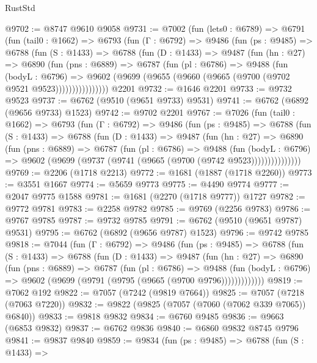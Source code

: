 \begin{lexlean}{RustStd}
\begin{coremodule}
@9702 := @8747 @9610 @9058
@9731 := @7002
    (fun (lets0 : @6789) =>
    @6791
      (fun (tail0 : @1662) =>
      @6793
        (fun (Γ : @6792) =>
        @9486
          (fun (ps : @9485) =>
          @6788
            (fun (S : @1433) =>
            @6788
              (fun (D : @1433) =>
              @9487
                (fun (hn : @27) =>
                @6890
                  (fun (pns : @6889) =>
                  @6787
                    (fun (pl : @6786) =>
                    @9488
                      (fun (bodyL : @6796) =>
                      @9602 (@9699 (@9655 (@9660 (@9665 (@9700 (@9702 @9521 @9523))))))))))))))))
    @2201
@9732 := @1646 @2201
@9733 := @9732 @9523
@9737 := @6762 (@9510 (@9651 @9733) @9531)
@9741 := @6762 (@6892 (@9656 @9733) @1523)
@9742 := @9702 @2201
@9767 := @7026
    (fun (tail0 : @1662) =>
    @6793
      (fun (Γ : @6792) =>
      @9486
        (fun (ps : @9485) =>
        @6788
          (fun (S : @1433) =>
          @6788
            (fun (D : @1433) =>
            @9487
              (fun (hn : @27) =>
              @6890
                (fun (pns : @6889) =>
                @6787
                  (fun (pl : @6786) =>
                  @9488
                    (fun (bodyL : @6796) =>
                    @9602 (@9699 (@9737 (@9741 (@9665 (@9700 (@9742 @9523)))))))))))))))
@9769 := @2206 (@1718 @2213)
@9772 := @1681 (@1887 (@1718 @2260))
@9773 := @3551 @1667
@9774 := @5659 @9773
@9775 := @4490 @9774
@9777 := @2047 @9775 @1588
@9781 := @1681 (@2270 (@1718 @9777)) @1727
@9782 := @9772 @9781
@9783 := @2258 @9782
@9785 := @9769 (@2256 @9783)
@9786 := @9767 @9785
@9787 := @9732 @9785
@9791 := @6762 (@9510 (@9651 @9787) @9531)
@9795 := @6762 (@6892 (@9656 @9787) @1523)
@9796 := @9742 @9785
@9818 := @7044
    (fun (Γ : @6792) =>
    @9486
      (fun (ps : @9485) =>
      @6788
        (fun (S : @1433) =>
        @6788
          (fun (D : @1433) =>
          @9487
            (fun (hn : @27) =>
            @6890
              (fun (pns : @6889) =>
              @6787
                (fun (pl : @6786) =>
                @9488
                  (fun (bodyL : @6796) =>
                  @9602 (@9699 (@9791 (@9795 (@9665 (@9700 @9796)))))))))))))
@9819 := @7062 @192
@9822 := @7057 (@7242 (@9819 @7664))
@9825 := @7057 (@7218 (@7063 @7220))
@9832 := @9822 (@9825 (@7057 (@7060 (@7062 @339 @7065)) @6840))
@9833 := @9818 @9832
@9834 := @6760 @9485
@9836 := @9663 (@6853 @9832)
@9837 := @6762 @9836
@9840 := @6860 @9832 @8745 @9796
@9841 := @9837 @9840
@9859 := @9834
    (fun (ps : @9485) =>
    @6788
      (fun (S : @1433) =>

\end{coremodule}
\end{lexlean}
